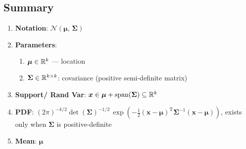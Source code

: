 \subsection{Summary}

\begin{enumerate}

    \item
    \textbf{Notation}:
    $  {\displaystyle {\mathcal {N}}({\boldsymbol {\mu }},\,{\boldsymbol {\Sigma }})} $
    \hfill \cite{wiki/Multivariate_normal_distribution}

    \item
    \textbf{Parameters}:
    \begin{enumerate}
        \item $\bm{\mu} \in \mathbb{R}^k$ — location
        \hfill \cite{wiki/Multivariate_normal_distribution}

        \item $\bm{\Sigma} \in \mathbb{R}^{k \times k}$: covariance (positive semi-definite matrix)
        \hfill \cite{wiki/Multivariate_normal_distribution}
    \end{enumerate}

    \item
    \textbf{Support/ Rand Var}:
    $  \bm{x} \in \bm{\mu} + \text{span}(\bm{\Sigma}) \subseteq \mathbb{R}^k $
    \hfill \cite{wiki/Multivariate_normal_distribution}

    \item
    \textbf{PDF}:
     ${\displaystyle (2\pi )^{-k/2}\det({\boldsymbol {\Sigma }})^{-1/2}\,\exp \left(-{\frac {1}{2}}(\mathbf {x} -{\boldsymbol {\mu }})^{\mathrm {T} }{\boldsymbol {\Sigma }}^{-1}(\mathbf {x} -{\boldsymbol {\mu }})\right)}$, exists only when $\bm{\Sigma}$ is positive-definite
    \hfill\cite{wiki/Multivariate_normal_distribution}



    \item
    \textbf{Mean}:
    $ \bm{\mu} $
    \hfill\cite{wiki/Multivariate_normal_distribution}



\end{enumerate}
